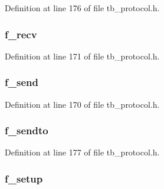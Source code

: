 Definition at line 176 of file tb\-\_\-protocol.\-h.

\hypertarget{structtb__protocol__t_aa1dc450b562c5216a20f25b4701ecb0f}{
\subsubsection[{f\-\_\-recv}]{ f\-\_\-recv}}\label{structtb__protocol__t_aa1dc450b562c5216a20f25b4701ecb0f}


Definition at line 171 of file tb\-\_\-protocol.\-h.

\hypertarget{structtb__protocol__t_a2709f2be8c51a5bc588388daf247fd42}{
\subsubsection[{f\-\_\-send}]{ f\-\_\-send}}\label{structtb__protocol__t_a2709f2be8c51a5bc588388daf247fd42}


Definition at line 170 of file tb\-\_\-protocol.\-h.

\hypertarget{structtb__protocol__t_a40bf261179f3043c4c05d5c030b3f463}{
\subsubsection[{f\-\_\-sendto}]{ f\-\_\-sendto}}\label{structtb__protocol__t_a40bf261179f3043c4c05d5c030b3f463}


Definition at line 177 of file tb\-\_\-protocol.\-h.

\hypertarget{structtb__protocol__t_ac590c819e0666511355921e638bca992}{
\subsubsection[{f\-\_\-setup}]{ f\-\_\-setup}}\label{structtb__protocol__t_ac590c819e0666511355921e638bca992}


